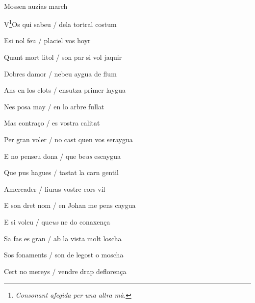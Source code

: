 \documentclass[12pt]{article}
\renewcommand{\espaiAbansEtiquetaPoema}{\vspace{0ex}}
\begin{document}
\begin{estrofa}

\espaiAbansEtiquetaPoema

\\

\begin{rubrica}

Mossen auzias march \clauTancada

\end{rubrica}

\end{estrofa}


\begin{estrofa}

 V\footnote{\textit{Consonant afegida per una altra m\`{a}}.}Os qui sabeu / dela
tortral costum

 Esi nol feu / placiel vos hoyr

 Quant mort litol / son par si vol jaquir

 Dobres damor / nebeu aygua de flum

 Ans en los clots / ensutza primer laygua

 Nes posa may / en lo arbre fullat

 Mas contra\c{c}o / es vostra calitat

 Per gran voler / no cast quen vos seraygua

\end{estrofa}



\begin{estrofa}

 E no penseu dona / que be\textit{us} escaygua

 Que pus hagues / tastat la carn gentil

 Amercader / liuras vostre cors vil

 E son dret nom / en Johan me pens caygua

 E si voleu / que\textit{us} ne do conaxen\c{c}a

 Sa fas es gran / ab la vista molt loscha

 Sos fonaments / son de legost o moscha

 Cert no mereys / vendre drap defloren\c{c}a

\end{estrofa}
\end{document}
